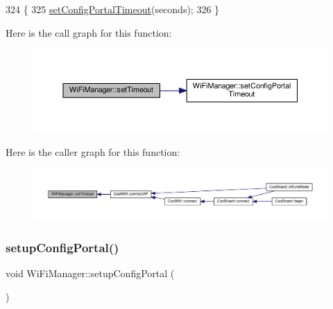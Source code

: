 \begin{DoxyCode}
324                                                   \{
325   \hyperlink{class_wi_fi_manager_a904006cb4d2c769e93bfdef336853766}{setConfigPortalTimeout}(seconds);
326 \}
\end{DoxyCode}
Here is the call graph for this function\+:\nopagebreak
\begin{figure}[H]
\begin{center}
\leavevmode
\includegraphics[width=350pt]{d4/dc8/class_wi_fi_manager_aa6493d59c284ff245edb767ff684756d_cgraph}
\end{center}
\end{figure}
Here is the caller graph for this function\+:\nopagebreak
\begin{figure}[H]
\begin{center}
\leavevmode
\includegraphics[width=350pt]{d4/dc8/class_wi_fi_manager_aa6493d59c284ff245edb767ff684756d_icgraph}
\end{center}
\end{figure}
\mbox{\label{class_wi_fi_manager_a1743325d0dd86d011df96b22d2a0ddd6}} 
\subsubsection{\texorpdfstring{setup\+Config\+Portal()}{setupConfigPortal()}}
{\footnotesize\ttfamily void Wi\+Fi\+Manager\+::setup\+Config\+Portal (\begin{DoxyParamCaption}{ }\end{DoxyParamCaption})\hspace{0.3cm}{\ttfamily [private]}}



